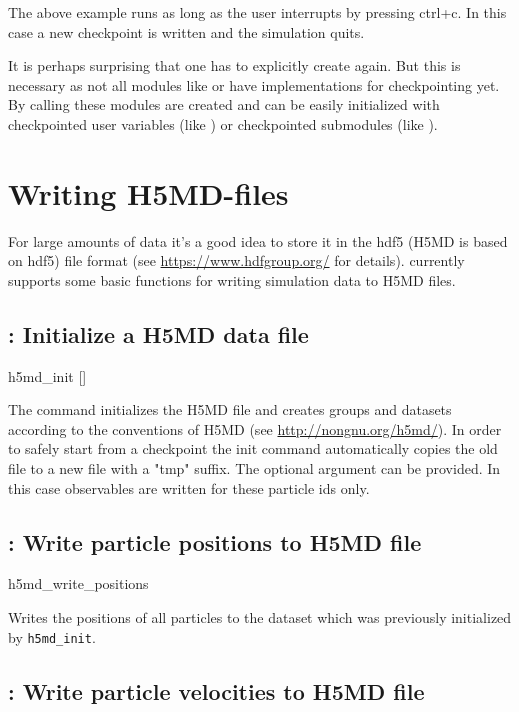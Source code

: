 The above example runs as long as the user interrupts by pressing ctrl+c. 
In this case a new checkpoint is written and the simulation quits.

It is perhaps surprising that one has to explicitly create  again. 
But this is necessary as not all \es modules like  or 
 have implementations for checkpointing yet. By calling 
 these modules are created and can be easily initialized with 
checkpointed user variables (like ) or checkpointed \es submodules 
(like ).


\section{Writing H5MD-files}
For large amounts of data it's a good idea to store it in the hdf5 (H5MD is
based on hdf5) file format
(see \url{https://www.hdfgroup.org/} for details). \es currently supports
some basic functions for writing simulation data to H5MD files.
\subsection{: Initialize a H5MD data file}

\begin{essyntax}
h5md_init  []
\end{essyntax}
The  command initializes the H5MD file and
creates groups and datasets according to the conventions of H5MD (see
\url{http://nongnu.org/h5md/}). In order to safely start from a
checkpoint the init command automatically copies the old file to a new file
with a "tmp" suffix. The optional argument  can be provided. In
this case observables are written for these particle ids only.

\subsection{: Write particle positions to H5MD
file}

\begin{essyntax}
h5md_write_positions
\end{essyntax}
Writes the positions of all particles to the dataset which was previously 
initialized by \texttt{h5md_init}.

\subsection{: Write particle velocities to H5MD
file}

